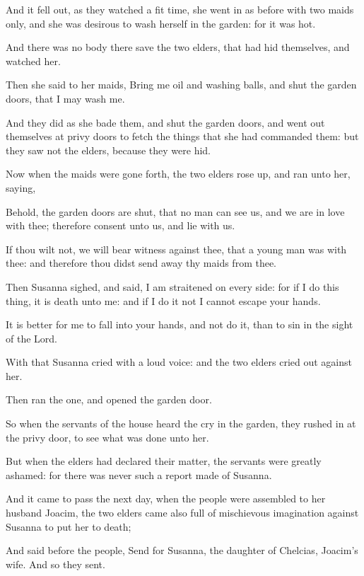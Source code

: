 {\par }{\PP {}And it fell out, as they watched a fit time, she went in as before with two maids only, and she was desirous to wash herself in the garden: for it was hot.
\par }{\PP {}And there was no body there save the two elders, that had hid themselves, and watched her.
\par }{\PP {}Then she said to her maids, Bring me oil and washing balls, and shut the garden doors, that I may wash me.
\par }{\PP {}And they did as she bade them, and shut the garden doors, and went out themselves at privy doors to fetch the things that she had commanded them: but they saw not the elders, because they were hid.
\par }{\PP {}Now when the maids were gone forth, the two elders rose up, and ran unto her, saying,
\par }{\PP {}Behold, the garden doors are shut, that no man can see us, and we are in love with thee; therefore consent unto us, and lie with us.
\par }{\PP {}If thou wilt not, we will bear witness against thee, that a young man was with thee: and therefore thou didst send away thy maids from thee.
\par }{\PP {}Then Susanna sighed, and said, I am straitened on every side: for if I do this thing, it is death unto me: and if I do it not I cannot escape your hands.
\par }{\PP {}It is better for me to fall into your hands, and not do it, than to sin in the sight of the Lord.
\par }{\PP {}With that Susanna cried with a loud voice: and the two elders cried out against her.
\par }{\PP {}Then ran the one, and opened the garden door.
\par }{\PP {}So when the servants of the house heard the cry in the garden, they rushed in at the privy door, to see what was done unto her.
\par }{\PP {}But when the elders had declared their matter, the servants were greatly ashamed: for there was never such a report made of Susanna.
\par }{\PP {}And it came to pass the next day, when the people were assembled to her husband Joacim, the two elders came also full of mischievous imagination against Susanna to put her to death;
\par }{\PP {}And said before the people, Send for Susanna, the daughter of Chelcias, Joacim’s wife. And so they sent.
}
